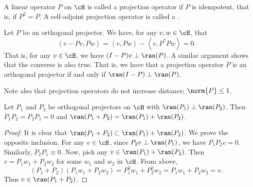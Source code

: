 \documentclass[oneside,reqno,letterpaper]{amsart}
\begin{document}
\begin{definition}
  A linear operator \(P\) on \(\cH\) is called a projection operator if \(P\) is idempotent, that is, if \(P^2 = P\). 
  A self-adjoint projection operator is called a . 
\end{definition}

Let \(P\) be an orthogonal projector. 
We have, for any \(v, w \in \cH\), that 
\[
  \left< v - Pv, Pw \right> 
  = \left< v, Pw \right> - \left< v, P^* P w \right>
  = 0. 
\] 
That is, for any \(v \in \cH\), we have \((I - P)v \perp \ran(P)\). 
A similar argument shows that the converse is also true.
That is, we have that a projection operator \(P\) is an orthogonal projector if and only if \(\ran(I - P) \perp \ran(P)\). 

Note also that projection operators do not increase distance; \(\norm{P} \leq 1\).

\begin{lemma}
\label{thm:orthogonal-projections}
  Let \(P_1\) and \(P_2\) be orthogonal projectors on \(\cH\) with \(\ran(P_1) \perp \ran(P_2)\).
  Then \(P_1P_2 = P_2P_1 = 0\) and \(\ran(P_1 + P_2) = \ran(P_1) + \ran(P_2)\). 
\end{lemma}
\begin{proof}
  It is clear that \(\ran(P_1 + P_2) \subset \ran(P_1) + \ran(P_2)\). 
  We prove the opposite inclusion. 
  For any \(v \in \cH\), since \(P_2v \perp \ran(P_1)\), we have \(P_1P_2v = 0\). 
  Similarly, \(P_2P_1 \equiv 0\). 
  Now, pick any \(v \in \ran(P_1) + \ran(P_2)\).
  Then \(v = P_1 w_1 + P_2 w_2\) for some \(w_1\) and \(w_2\) in \(\cH\).  
  From above, 
  \[
    (P_1 + P_2)(P_1w_1 + P_2w_2)
    = P_1^2 w_1 + P_2^2 w_2
    = P_1w_1 + P_2 w_2
    = v.
  \] 
  Thus \(v \in \ran(P_1 + P_2)\). 
\end{proof}

\end{document}
